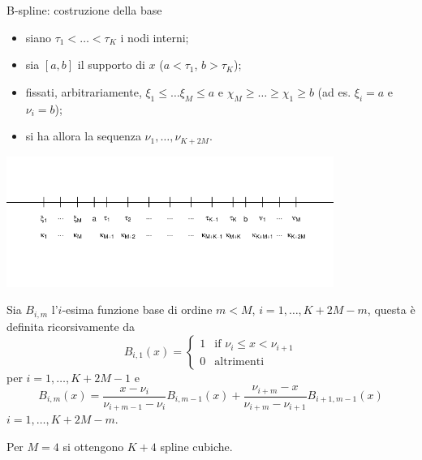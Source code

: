 \documentclass{beamer}\usepackage[]{graphicx}\usepackage[]{color}
\newenvironment{knitrout}{}{} %
\begin{document}
\begin{frame}[fragile,allowframebreaks=0.95]{B-spline: costruzione della base}
\begin{itemize}
\item siano $\tau_1 < \ldots < \tau_K$ i nodi interni;
\item sia $[a,b]$ il supporto di $x$ ($a<\tau_1$, $b>\tau_K$);
\item fissati, arbitrariamente, $\xi_1\leq \ldots \xi_M \leq a$ e $\chi_M\geq \ldots \geq \chi_1 \geq b$ (ad es. $\xi_i=a$ e $\nu_i=b$);
\item si ha allora la sequenza $\nu_1,\ldots,\nu_{K+2M}$.
\end{itemize}
\begin{center}
\begin{knitrout}
\color{fgcolor}
\includegraphics[width=0.8\textwidth]{figure/020-regression-1unnamed-chunk-36-1} 

\end{knitrout}
\end{center}

\break

Sia $B_{i,m}$ l'$i$-esima funzione base di ordine $m<M$, $i=1,\ldots, K+2M-m$, questa \`e definita ricorsivamente da
\[
B_{i,1}(x) = \begin{cases} 1 &\mbox{if }\nu_i\leq x < \nu_{i+1} \\ 0 & \mbox{altrimenti} \end{cases}
\]
per $i = 1,\ldots,K + 2M-1$ e
\[ 
B_{i,m}(x) = \frac{x-\nu_i}{\nu_{i+m-1}-\nu_i}B_{i,m-1}(x) +
\frac{\nu_{i+m}-x}{\nu_{i+m}-\nu_{i+1}}B_{i+1,m-1}(x)
\]
$i = 1,\ldots,K + 2M-m$.

Per $M=4$ si ottengono $K+4$ spline cubiche.


\end{frame}
\end{document}
